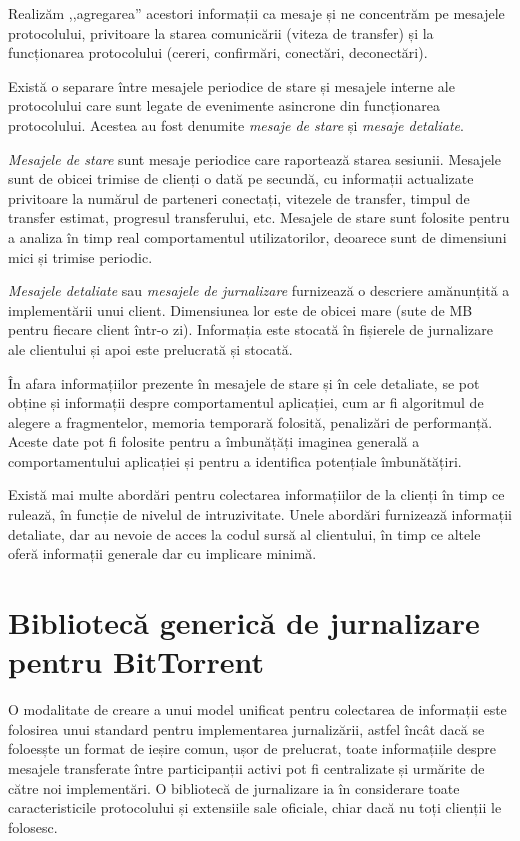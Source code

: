 Realizăm ,,agregarea'' acestori informații ca mesaje și ne concentrăm pe
mesajele protocolului, privitoare la starea comunicării (viteza de transfer)
și la funcționarea protocolului (cereri, confirmări, conectări, deconectări).

Există o separare între mesajele periodice de stare și mesajele interne ale
protocolului care sunt legate de evenimente asincrone din funcționarea
protocolului. Acestea au fost denumite \textit{mesaje de stare} și
\textit{mesaje detaliate}.

\textit{Mesajele de stare} sunt mesaje periodice care raportează starea
sesiunii. Mesajele sunt de obicei trimise de clienți o dată pe secundă, cu
informații actualizate privitoare la numărul de parteneri conectați,
vitezele de transfer, timpul de transfer estimat, progresul transferului, etc.
Mesajele de stare sunt folosite pentru a analiza în timp real comportamentul
utilizatorilor, deoarece sunt de dimensiuni mici și trimise periodic.

\textit{Mesajele detaliate} sau \textit{mesajele de jurnalizare} 
furnizează o descriere amănunțită a implementării unui client. Dimensiunea lor
este de obicei mare (sute de MB pentru fiecare client într-o zi). Informația
este stocată în fișierele de jurnalizare ale clientului și apoi este prelucrată
și stocată.

În afara informațiilor prezente în mesajele de stare și în cele detaliate,
se pot obține și informații despre comportamentul aplicației, cum ar fi
algoritmul de alegere a fragmentelor, memoria temporară folosită, penalizări
de performanță. Aceste date pot fi folosite pentru a îmbunățăți imaginea
generală a comportamentului aplicației și pentru a identifica potențiale
îmbunătățiri.

Există mai multe abordări pentru colectarea informațiilor de la clienți în
timp ce rulează, în funcție de nivelul de intruzivitate. Unele abordări
furnizează informații detaliate, dar au nevoie de acces la codul sursă al
clientului, în timp ce altele oferă informații generale dar cu implicare minimă.

\section{Bibliotecă generică de jurnalizare pentru BitTorrent}
\label{sec:proto-measure:log-library}

O modalitate de creare a unui model unificat pentru colectarea de informații
este folosirea unui standard pentru implementarea jurnalizării, astfel încât
dacă se foloesște un format de ieșire comun, ușor de prelucrat, toate
informațiile despre mesajele transferate între participanții activi pot fi
centralizate și urmărite de către noi implementări. O bibliotecă de jurnalizare
ia în considerare toate caracteristicile protocolului și extensiile sale
oficiale, chiar dacă nu toți clienții le folosesc.

